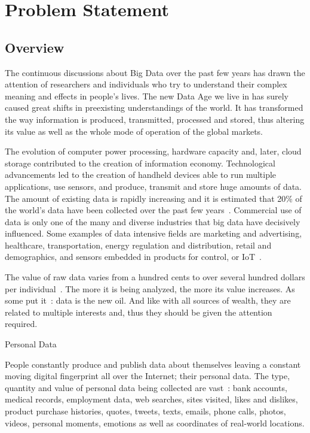 \chapter{Problem Statement}
\label{problem}

\section{Overview}
\label{problem:overview}

The continuous discussions about Big Data over the past few years has drawn the attention of researchers and individuals who try to understand their complex meaning and effects in people's lives. The new Data Age we live in has surely caused great shifts in preexisting understandings of the world.  It has transformed the way information is produced, transmitted, processed and stored, thus altering its value as well as the whole mode of operation of the global markets.

The evolution of computer power processing, hardware capacity and, later,  cloud storage contributed to the creation of information economy. Technological advancements led to the creation of handheld devices able to run multiple applications, use sensors, and produce, transmit and store huge amounts of data. The amount of existing data is rapidly increasing and it is estimated that 20\% of the world's data have been collected over the past few years~\cite{10.1109/SPW.2015.27,big_data_better_worse}. Commercial use of data is only one of the many and diverse industries that big data have decisively influenced. Some examples of data intensive fields are marketing and advertising, healthcare, transportation, energy regulation and distribution, retail and demographics, and sensors  embedded in products for control, or IoT~\cite{big_data}.

The value of raw data varies from a hundred cents to over several hundred dollars per individual~\cite{pr_data_cost_1, pr_data_cost_2, pr_data_cost_3}. The more it is being analyzed, the more its value increases. As some put it~\cite{data_new_oil_01,data_new_oil_02,data_new_oil_03,data_new_oil_04,data_new_oil_05,data_new_oil_05,data_new_oil_06,data_new_oil_07,data_new_oil_08,data_new_oil_09}: data is the new oil. And like with all sources of wealth, they are related to multiple interests and, thus they should be given the attention required.

Personal Data

People constantly produce and publish data about themselves
leaving a constant moving digital fingerprint all over the Internet; their personal data. The type, quantity and value of personal data being collected are vast~\cite{emergence_new_assets_wef}: bank accounts, medical records, employment data, web searches, sites visited,
likes and dislikes, product purchase histories, quotes, tweets, texts, emails, phone calls, photos, videos, personal moments, emotions as well as coordinates of real-world locations.

